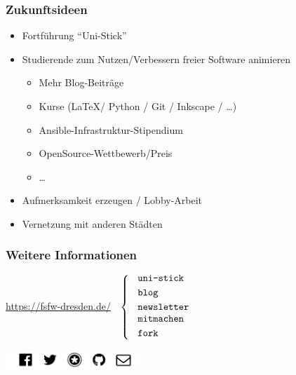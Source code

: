 \documentclass{beamer}
\begin{document}

\begin{frame}[label=ct3]
  \frametitle{Zukunftsideen}

  \begin{itemize}
  \item Fortführung "`Uni-Stick"'
  \item Studierende zum Nutzen/Verbessern freier Software animieren
    \begin{itemize}
    \item Mehr Blog-Beiträge
    \item Kurse (\LaTeX / Python / Git / Inkscape / \dots)
    \item Ansible-Infrastruktur-Stipendium
    \item OpenSource-Wettbewerb/Preis
    \item \dots
    \end{itemize}

    \bigskip

  \item Aufmerksamkeit erzeugen / Lobby-Arbeit

    \bigskip

  \item Vernetzung mit anderen Städten

  \end{itemize}

\end{frame}


\begin{frame}[label=ct4]
  \frametitle{Weitere Informationen}

  \onslide<+->

  \begin{center}
    \url{https://fsfw-dresden.de/}
    $\;\;\left\{\;\;\text{
        \parbox{2.3cm}{
          \texttt{uni-stick}\\[1mm]
          \texttt{blog}\\[1mm]
          \texttt{newsletter}
          \texttt{mitmachen}\\[1mm]
          \texttt{fork}\\[-3mm]
        }}
    \right.$

    \vspace*{2\bigskipamount}

    \includegraphics[width=50mm]{img-src/fsfw-netzwerke}
  \end{center}

\end{frame}
\end{document}
